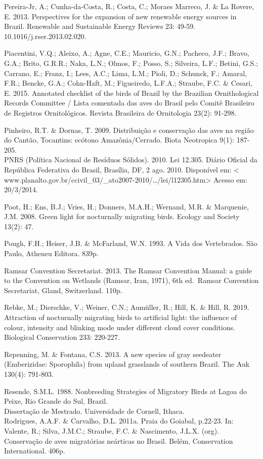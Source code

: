 \documentclass[
]{scrbook}
\begin{document}
Pereira-Jr, A.; Cunha-da-Costa, R.; Costa, C.; Moraes Marreco, J. \& La Rovere, E. 2013. Perspectives for the expansion of new renewable energy sources in Brazil. Renewable and Sustainable Energy Reviews 23: 49-59. 10.1016/j.rser.2013.02.020.

Piacentini, V.Q.; Aleixo, A.; Agne, C.E.; Mauricio, G.N.; Pacheco, J.F.; Bravo, G.A.; Brito, G.R.R.; Naka, L.N.; Olmos, F.; Posso, S.; Silveira, L.F.; Betini, G.S.; Carrano, E.; Franz, I.; Lees, A.C.; Lima, L.M.; Pioli, D.; Schunck, F.; Amaral, F.R.; Bencke, G.A.; Cohn-Haft, M.; Figueiredo, L.F.A.; Straube, F.C. \& Cesari, E. 2015. Annotated checklist of the birds of Brazil by the Brazilian Ornithological Records Committee / Lista comentada das aves do Brasil pelo Comitê Brasileiro de Registros Ornitológicos. Revista Brasileira de Ornitologia 23(2): 91-298.

Pinheiro, R.T. \& Dornas, T. 2009. Distribuição e conservação das aves na região do Cantão, Tocantins: ecótono Amazônia/Cerrado. Biota Neotropica 9(1): 187-205.\\
PNRS (Política Nacional de Resíduos Sólidos). 2010. Lei 12.305. Diário Oficial da República Federativa do Brasil, Brasília, DF, 2 ago. 2010. Disponível em: \textless{} www.planalto.gov.br/ccivil\_03/\_ato2007-2010/\ldots/lei/l12305.htm\textgreater{} Acesso em: 20/3/2014.

Poot, H.; Ens, B.J.; Vries, H.; Donners, M.A.H.; Wernand, M.R. \& Marquenie, J.M. 2008. Green light for nocturnally migrating birds. Ecology and Society 13(2): 47.

Pough, F.H.; Heiser, J.B. \& McFarland, W.N. 1993. A Vida dos Vertebrados. São Paulo, Atheneu Editora. 839p.

Ramsar Convention Secretariat. 2013. The Ramsar Convention Manual: a guide to the Convention on Wetlands (Ramsar, Iran, 1971), 6th ed.~Ramsar Convention Secretariat, Gland, Switzerland. 110p.

Rebke, M.; Dierschke, V.; Weiner, C.N.; Aumüller, R.; Hill, K. \& Hill, R. 2019. Attraction of nocturnally migrating birds to artificial light: the influence of colour, intensity and blinking mode under different cloud cover conditions. Biological Conservation 233: 220-227.

Repenning, M. \& Fontana, C.S. 2013. A new species of gray seedeater (Emberizidae: Sporophila) from upland grasslands of southern Brazil. The Auk 130(4): 791-803.

Resende, S.M.L. 1988. Nonbreeding Strategies of Migratory Birds at Lagoa do Peixe, Rio Grande do Sul, Brazil.\\
Dissertação de Mestrado. Universidade de Cornell, Ithaca.\\
Rodrigues, A.A.F. \& Carvalho, D.L. 2011a. Praia do Goiabal, p.22-23. In: Valente, R.; Silva, J.M.C.; Straube, F.C. \& Nascimento, J.L.X. (org). Conservação de aves migratórias neárticas no Brasil. Belém, Conservation International. 406p.
\end{document}
